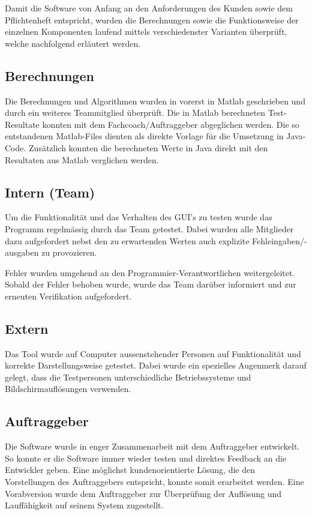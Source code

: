 Damit  die Software  von  Anfang an  den Anforderungen  des  Kunden sowie  dem
Pflichtenheft entspricht, wurden die Berechnungen sowie die Funktionsweise der
einzelnen Komponenten laufend mittels verschiedenster Varianten \"uberpr\"uft,
welche nachfolgend erl\"autert werden.

\subsection{Berechnungen}
Die Berechnungen und  Algorithmen wurden in vorerst in  Matlab geschrieben und
durch  ein  weiteres  Teammitglied \"uberpr\"uft. Die  in  Matlab  berechneten
Test-Resultate konnten mit  dem Fachcoach/Auftraggeber abgeglichen werden. Die
so entstandenen Matlab-Files  dienten als direkte Vorlage  f\"ur die Umsetzung
in Java-Code. Zus\"atzlich  konnten die berechneten  Werte in Java  direkt mit
den Resultaten aus Matlab verglichen werden.

\subsection{Intern (Team)}
Um  die  Funktionalit\"at  und  das   Verhalten  des  GUI’s  zu  testen  wurde
das  Programm  regelm\"assig  durch   das  Team  getestet. Dabei  wurden  alle
Mitglieder dazu  aufgefordert nebst den  zu erwartenden Werten  auch explizite
Fehleingaben/-ausgaben zu provozieren.

Fehler     wurden     umgehend     an     den     Programmier-Verantwortlichen
weitergeleitet. Sobald  der Fehler  behoben  wurde, wurde  das Team  dar\"uber
informiert und zur erneuten Verifikation aufgefordert.

\subsection{Extern}
Das Tool wurde auf Computer  aussenstehender Personen auf Funktionalit\"at und
korrekte  Darstellungsweise  getestet. Dabei  wurde ein  spezielles  Augenmerk
darauf  gelegt, dass  die  Testpersonen  unterschiedliche Betriebssysteme  und
Bildschirmaufl\"osungen verwenden.


\subsection{Auftraggeber}
Die Software wurde in enger Zusammenarbeit mit dem Auftraggeber entwickelt. So
konnte  er  die  Software  immer   wieder  testen  und  direktes  Feedback  an
die  Entwickler   geben. Eine  m\"oglichst  kundenorientierte   L\"osung,  die
den  Vorstellungen  des  Auftraggebers  entspricht,  konnte  somit  erarbeitet
werden. Eine  Vorabversion  wurde  dem Auftraggeber  zur  \"Uberpr\"ufung  der
Aufl\"osung und Lauff\"ahigkeit auf seinem System zugestellt.
